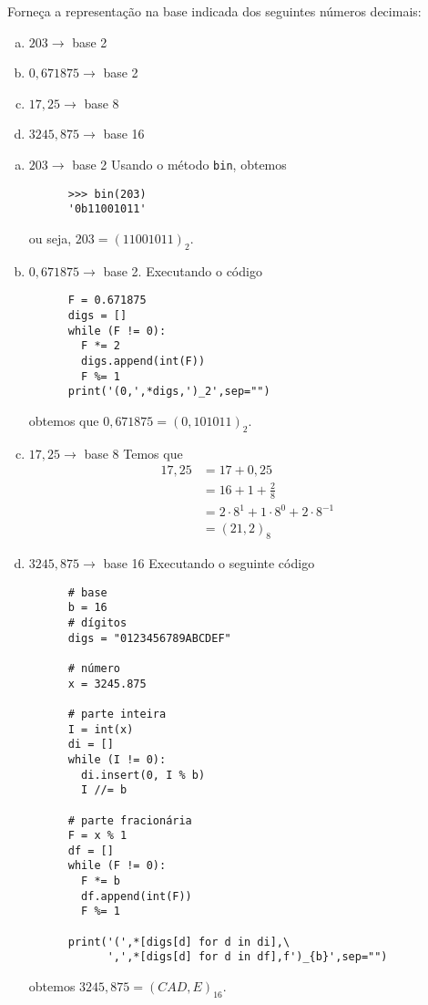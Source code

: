 \begin{exeresol}
  Forneça a representação na base indicada dos seguintes números decimais:
  \begin{enumerate}[a)]
  \item $203 \to$ base 2
  \item $0,671875 \to$ base 2
  \item $17,25 \to$ base 8
  \item $3245,875 \to$ base 16
  \end{enumerate}
\end{exeresol}
\begin{resol}
  \begin{enumerate}[a)]
  \item $203 \to$ base 2
    \ifispython
    Usando o método {\python} \lstinline+bin+, obtemos
    \begin{lstlisting}
      >>> bin(203)
      '0b11001011'
    \end{lstlisting}
    ou seja, $203 = (11001011)_2$.
    \fi
  \item $0,671875 \to$ base 2.
    \ifispython
    Executando o código
    \begin{lstlisting}
      F = 0.671875
      digs = []
      while (F != 0):
        F *= 2
        digs.append(int(F))
        F %= 1
      print('(0,',*digs,')_2',sep="")      
    \end{lstlisting}
    obtemos que $0,671875 = (0,101011)_2$.
    \fi
  \item $17,25 \to$ base 8
    Temos que
    \begin{align}
      17,25 &= 17 + 0,25\\
            &= 16 + 1 + \frac{2}{8}\\
            &= 2\cdot 8^1 + 1\cdot 8^0 + 2\cdot 8^{-1}\\
            &= (21,2)_8
    \end{align}
  \item $3245,875 \to$ base 16
    \ifispython
    Executando o seguinte código
    \begin{lstlisting}
      # base
      b = 16
      # dígitos
      digs = "0123456789ABCDEF"

      # número
      x = 3245.875

      # parte inteira 
      I = int(x)
      di = []
      while (I != 0):
        di.insert(0, I % b)
        I //= b

      # parte fracionária
      F = x % 1
      df = []
      while (F != 0):
        F *= b
        df.append(int(F))
        F %= 1

      print('(',*[digs[d] for d in di],\
            ',',*[digs[d] for d in df],f')_{b}',sep="")      
    \end{lstlisting}
    obtemos $3245,875 = (CAD,E)_{16}$.      
    \fi
  \end{enumerate}
\end{resol}

